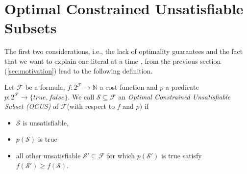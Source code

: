\documentclass[a4paper,UKenglish,cleveref, autoref, thm-restate, pdfa]{lipics-v2021}
\newcommand\m[1]{\mathcal{#1}}
\renewcommand\comment[1]{}
\newcommand{\tias}[1]{{\comment{\color{blue}Tias:#1}}}
\newcommand{\bart}[1]{{\comment{\color{OliveGreen}Bart: #1}}}
\newcommand\formula{\ensuremath{\m{F} }\xspace}
\newcommand\formulag{\ensuremath{\m{G} }\xspace}
\newcommand\mm[1]{\ensuremath{#1}\xspace}
\newcommand\nat{\mm{\mathbb{N}}}
\begin{document}

\section{Optimal Constrained Unsatisfiable Subsets}\label{sec:OCUS}

The first two considerations, i.e., 
the lack of optimality guarantees and the fact that we want to explain one literal at a time%
, from the previous section (\cref{sec:motivation}) lead to the following definition.
%

\begin{definition}\label{definition:ocus}
	Let $\formula$ be a formula, $f:2^{\formula} \to \nat$ a cost function and  $p$ a predicate $p: 2^{\formula} \to \{\mathit{true}, \mathit{false} \}$. 
	We call %
		$\m{S} \subseteq \formula$ an \emph{Optimal Constrained Unsatisfiable Subset (OCUS)} of \formula (with respect to $f$ and $p$) if 
		\begin{itemize}                                      
			\item $\m{S}$ is unsatisfiable,
			\item $p(\m{S})$ is true
			\item all other unsatisfiable $\m{S}'\subseteq \formula$ for which $p(\m{S}')$ is true satisfy $f(\m{S}')\geq f(\m{S})$.
		\end{itemize}
	\end{definition}
	
\end{document}
